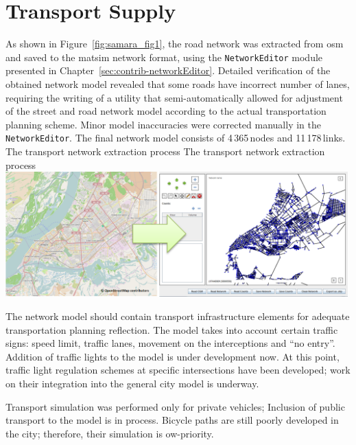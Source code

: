 \section{Transport Supply}
As shown in Figure~\ref{fig:samara_fig1}, the road network was extracted from \gls{osm} and saved to the \gls{matsim} network format, using the \lstinline|NetworkEditor| module presented in Chapter~\ref{sec:contrib-networkEditor}. 
Detailed verification of the obtained network model revealed that some roads have incorrect number of lanes, requiring the writing of a utility that semi-automatically allowed for adjustment of the street and road network model according to the actual transportation planning scheme. Minor model inaccuracies were corrected manually in the \lstinline|NetworkEditor|. The final network model consists of 4\,365\,nodes and 11\,178\,links.
%
\createfigure%
{The transport network extraction process}%
{The transport network extraction process}%
{\label{fig:samara_fig1}}%
{\includegraphics[width=0.99\textwidth, angle=0]{./scenarios/figures/samara_fig1.png}}%
{}

The network model should contain transport infrastructure elements for adequate transportation planning reflection. The model takes into account certain traffic signs: speed limit, traffic lanes, movement on the interceptions and ``no entry''. Addition of traffic lights to the model is under development now. At this point, traffic light regulation schemes at specific intersections have been developed; work on their integration into the general city model is underway.

Transport simulation was performed only for private vehicles; Inclusion of public transport to the model is in process. Bicycle paths are still poorly developed in the city; therefore, their simulation is ow-priority. 

